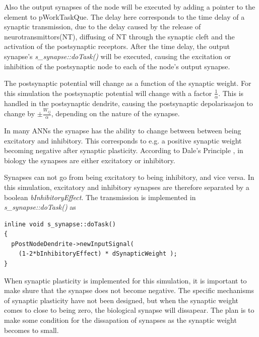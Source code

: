	Also the output synapses of the node will be executed by adding a pointer to the element to pWorkTaskQue.
	The delay here corresponds to the time delay of a synaptic transmission, due to the delay caused by the release of neurotransmittors(NT), diffusing of NT through the synaptic cleft and the activation of the postsynaptic receptors.
	After the time delay, the output synapse's \emph{s\_synapse::doTask()} will be executed, causing the excitation or inhibition of the postsynaptic node to each of the node's output synapse. 
	
	The postsynaptic potential will change as a function of the synaptic weight. For this simulation the postsynaptic potential will change with a factor $\frac{1}{\alpha}$. 
	This is handled in the postsynaptic dendrite, causing the postsynaptic depolarisasjon to change by $\pm \frac{W_{ij}}{\alpha}$, depending on the nature of the synapse.

	In many ANNs the synapse has the ability to change between between being excitatory and inhibitory. 
	This corresponds to e.g. a positive synaptic weight becoming negative after synaptic plasticity.
	According to Dale's Principle %
		, in biology the synapses are either excitatory or inhibitory.

	Synapses can not go from being excitatory to being inhibitory, and vice versa.
	In this simulation, excitatory and inhibitory synapses are therefore separated by a boolean \emph{bInhibitoryEffect}. The transmission is implemented in \emph{s\_synapse::doTask()} as
\begin{lstlisting}
inline void s_synapse::doTask()
{
  pPostNodeDendrite->newInputSignal( 
    (1-2*bInhibitoryEffect) * dSynapticWeight );
}
\end{lstlisting}
	When synaptic plasticity is implemented for this simulation, it is important to make shure that the synapse does not become negative. 
	The specific mechanisms of synaptic plasticity have not been designed, but when the synaptic weight comes to close to being zero, the biological synapse will dissapear.
	The plan is to make some condition for the dissapation of synapses as the synaptic weight becomes to small.


